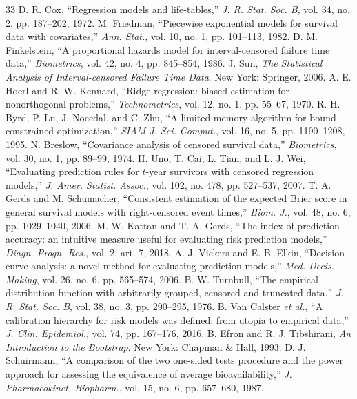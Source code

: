\documentclass[journal]{IEEEtran}
\begin{document}
\begin{thebibliography}{33}
 D. R. Cox, ``Regression models and life-tables,'' \emph{J. R. Stat. Soc. B}, vol. 34, no. 2, pp. 187--202, 1972.
 M. Friedman, ``Piecewise exponential models for survival data with covariates,'' \emph{Ann. Stat.}, vol. 10, no. 1, pp. 101--113, 1982.
 D. M. Finkelstein, ``A proportional hazards model for interval-censored failure time data,'' \emph{Biometrics}, vol. 42, no. 4, pp. 845--854, 1986.
 J. Sun, \emph{The Statistical Analysis of Interval-censored Failure Time Data}. New York: Springer, 2006.
 A. E. Hoerl and R. W. Kennard, ``Ridge regression: biased estimation for nonorthogonal problems,'' \emph{Technometrics}, vol. 12, no. 1, pp. 55--67, 1970.
 R. H. Byrd, P. Lu, J. Nocedal, and C. Zhu, ``A limited memory algorithm for bound constrained optimization,'' \emph{SIAM J. Sci. Comput.}, vol. 16, no. 5, pp. 1190--1208, 1995.
 N. Breslow, ``Covariance analysis of censored survival data,'' \emph{Biometrics}, vol. 30, no. 1, pp. 89--99, 1974.
 H. Uno, T. Cai, L. Tian, and L. J. Wei, ``Evaluating prediction rules for $t$-year survivors with censored regression models,'' \emph{J. Amer. Statist. Assoc.}, vol. 102, no. 478, pp. 527--537, 2007.
 T. A. Gerds and M. Schumacher, ``Consistent estimation of the expected Brier score in general survival models with right-censored event times,'' \emph{Biom. J.}, vol. 48, no. 6, pp. 1029--1040, 2006.
 M. W. Kattan and T. A. Gerds, ``The index of prediction accuracy: an intuitive measure useful for evaluating risk prediction models,'' \emph{Diagn. Progn. Res.}, vol. 2, art. 7, 2018.
 A. J. Vickers and E. B. Elkin, ``Decision curve analysis: a novel method for evaluating prediction models,'' \emph{Med. Decis. Making}, vol. 26, no. 6, pp. 565--574, 2006.
 B. W. Turnbull, ``The empirical distribution function with arbitrarily grouped, censored and truncated data,'' \emph{J. R. Stat. Soc. B}, vol. 38, no. 3, pp. 290--295, 1976.
 B. Van Calster \emph{et al.}, ``A calibration hierarchy for risk models was defined: from utopia to empirical data,'' \emph{J. Clin. Epidemiol.}, vol. 74, pp. 167--176, 2016.
 B. Efron and R. J. Tibshirani, \emph{An Introduction to the Bootstrap}. New York: Chapman \& Hall, 1993.
 D. J. Schuirmann, ``A comparison of the two one-sided tests procedure and the power approach for assessing the equivalence of average bioavailability,'' \emph{J. Pharmacokinet. Biopharm.}, vol. 15, no. 6, pp. 657--680, 1987.

\end{thebibliography}
\end{document}
